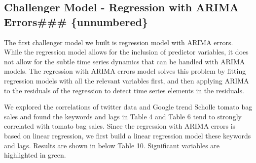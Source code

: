 \documentclass[12pt,oneside]{chicagocapstone}
\begin{document}
\subsection{Challenger Model - Regression with ARIMA Errors\#\#\#
\{unnumbered\}}\label{challenger-model---regression-with-arima-errors-unnumbered}

The first challenger model we built is regression model with ARIMA
errors. While the regression model allows for the inclusion of predictor
variables, it does not allow for the subtle time series dynamics that
can be handled with ARIMA models. The regression with ARIMA errors model
solves this problem by fitting regression models with all the relevant
variables first, and then applying ARIMA to the residuals of the
regression to detect time series elements in the residuals.

We explored the correlations of twitter data and Google trend Scholle
tomato bag sales and found the keywords and lags in Table 4 and Table 6
tend to strongly correlated with tomato bag sales. Since the regression
with ARIMA errors is based on linear regression, we first build a linear
regression model these keywords and lags. Results are shown in below
Table 10. Significant variables are highlighted in green.
\end{document}
